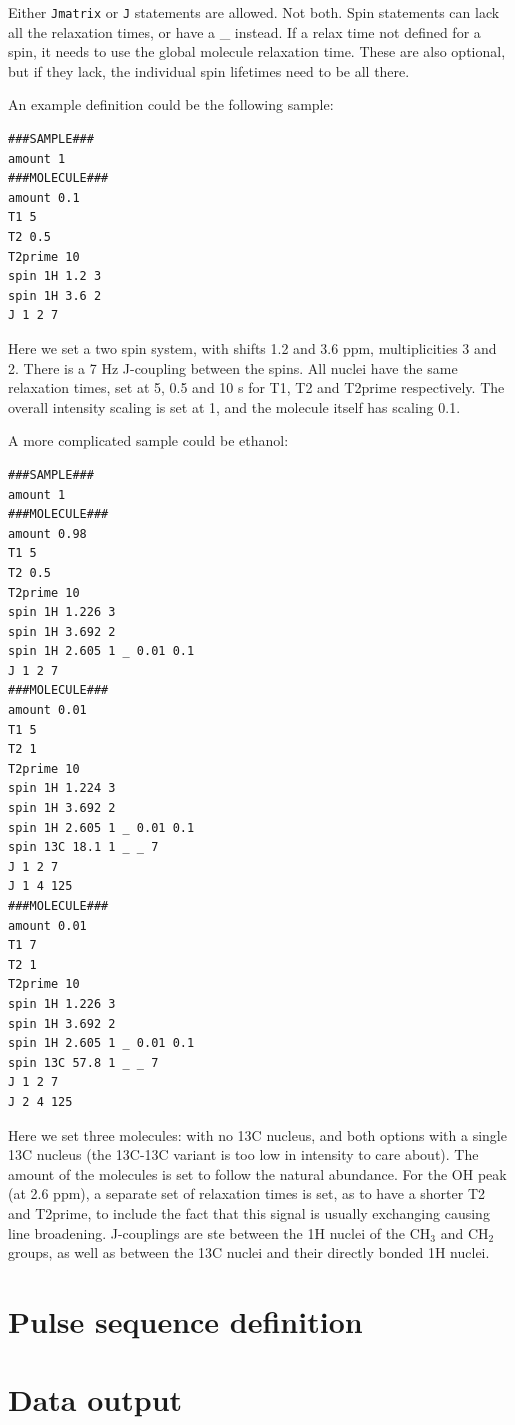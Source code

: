 \documentclass[11pt,a4paper]{article}
\begin{document}
Either \texttt{Jmatrix} or \texttt{J} statements are allowed. Not both.
Spin statements can lack all the relaxation times, or have a \_ instead.
If a relax time not defined for a spin, it needs to use the global molecule relaxation time.
These are also optional, but if they lack, the individual spin lifetimes need to be all there.

An example definition could be the following sample:
\begin{verbatim}
###SAMPLE###
amount 1
###MOLECULE###
amount 0.1
T1 5
T2 0.5
T2prime 10
spin 1H 1.2 3
spin 1H 3.6 2
J 1 2 7
\end{verbatim}
Here we set a two spin system, with shifts 1.2 and 3.6 ppm, multiplicities 3 and 2. There is a 7 Hz J-coupling between the spins. All nuclei have the same relaxation times, set at 5, 0.5 and 10 s for T1, T2 and T2prime respectively. The overall intensity scaling is set at 1, and the molecule itself has scaling 0.1.

A more complicated sample could be ethanol:
\begin{verbatim}
###SAMPLE###
amount 1
###MOLECULE###
amount 0.98 
T1 5
T2 0.5
T2prime 10
spin 1H 1.226 3
spin 1H 3.692 2
spin 1H 2.605 1 _ 0.01 0.1
J 1 2 7
###MOLECULE###
amount 0.01 
T1 5
T2 1
T2prime 10
spin 1H 1.224 3
spin 1H 3.692 2
spin 1H 2.605 1 _ 0.01 0.1
spin 13C 18.1 1 _ _ 7
J 1 2 7
J 1 4 125
###MOLECULE###
amount 0.01 
T1 7
T2 1
T2prime 10
spin 1H 1.226 3
spin 1H 3.692 2
spin 1H 2.605 1 _ 0.01 0.1
spin 13C 57.8 1 _ _ 7
J 1 2 7
J 2 4 125
\end{verbatim}
Here we set three molecules: with no 13C nucleus, and both options with a single 13C nucleus (the 13C-13C variant is too low in intensity to care about). The amount of the molecules is set to follow the natural abundance. For the OH peak (at 2.6 ppm), a separate set of relaxation times is set, as to have a shorter T2 and T2prime, to include the fact that this signal is usually exchanging causing line broadening. J-couplings are ste between the 1H nuclei of the CH$_3$ and CH$_2$ groups, as well as between the 13C nuclei and their directly bonded 1H nuclei. 

\section{Pulse sequence definition}\label{sec:pulseseq}

\section{Data output}
\end{document}

